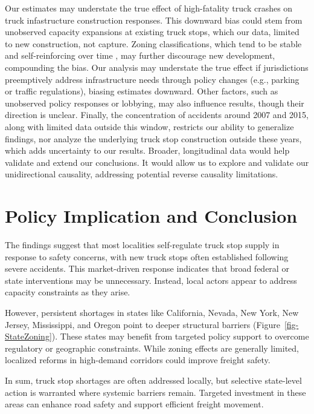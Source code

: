 \documentclass[
  12pt]{article}
\begin{document}
Our estimates may understate the true effect of high-fatality truck
crashes on truck infastructure construction responses. This downward
bias could stem from unobserved capacity expansions at existing truck
stops, which our data, limited to new construction, not capture. Zoning
classifications, which tend to be stable and self-reinforcing over time
\citep{mclaughlinLandUseRegulation2012}, may further discourage new
development, compounding the bias. Our analysis may understate the true
effect if jurisdictions preemptively address infrastructure needs
through policy changes (e.g., parking or traffic regulations), biasing
estimates downward. Other factors, such as unobserved policy responses
or lobbying, may also influence results, though their direction is
unclear. Finally, the concentration of accidents around 2007 and 2015,
along with limited data outside this window, restricts our ability to
generalize findings, nor analyze the underlying truck stop construction
outside these years, which adds uncertainty to our results. Broader,
longitudinal data would help validate and extend our conclusions. It
would allow us to explore and validate our unidirectional causality,
addressing potential reverse causality limitations.

\section{Policy Implication and
Conclusion}\label{policy-implication-and-conclusion}

The findings suggest that most localities self-regulate truck stop
supply in response to safety concerns, with new truck stops often
established following severe accidents. This market-driven response
indicates that broad federal or state interventions may be unnecessary.
Instead, local actors appear to address capacity constraints as they
arise.

However, persistent shortages in states like California, Nevada, New
York, New Jersey, Mississippi, and Oregon point to deeper structural
barriers (Figure~\ref{fig-StateZoning}). These states may benefit from
targeted policy support to overcome regulatory or geographic
constraints. While zoning effects are generally limited, localized
reforms in high-demand corridors could improve freight safety.

In sum, truck stop shortages are often addressed locally, but selective
state-level action is warranted where systemic barriers remain. Targeted
investment in these areas can enhance road safety and support efficient
freight movement.
\end{document}
